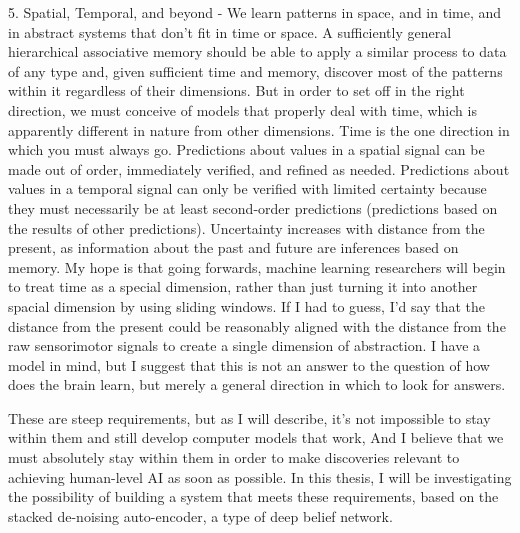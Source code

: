 \documentclass[12pt]{article}
\begin{document}
5. Spatial, Temporal, and beyond - We learn patterns in space, and in time, and in abstract systems that don't fit in time or space. A sufficiently general hierarchical associative memory should be able to apply a similar process to data of any type and, given sufficient time and memory, discover most of the patterns within it regardless of their dimensions. But in order to set off in the right direction, we must conceive of models that properly deal with time, which is apparently different in nature from other dimensions. Time is the one direction in which you must always go. Predictions about values in a spatial signal can be made out of order, immediately verified, and refined as needed. Predictions about values in a temporal signal can only be verified with limited certainty because they must necessarily be at least second-order predictions (predictions based on the results of other predictions). Uncertainty increases with distance from the present, as information about the past and future are inferences based on memory. My hope is that going forwards, machine learning researchers will begin to treat time as a special dimension, rather than just turning it into another spacial dimension by using sliding windows. If I had to guess, I'd say that the distance from the present could be reasonably aligned with the distance from the raw sensorimotor signals to create a single dimension of abstraction. I have a model in mind, but I suggest that this is not an answer to the question of how does the brain learn, but merely a general direction in which to look for answers.

These are steep requirements, but as I will describe, it's not impossible to stay within them and still develop computer models that work, And I believe that we must absolutely stay within them in order to make discoveries relevant to achieving human-level AI as soon as possible. In this thesis, I will be investigating the possibility of building a system that meets these requirements, based on the stacked de-noising auto-encoder, a type of deep belief network.
\end{document}
